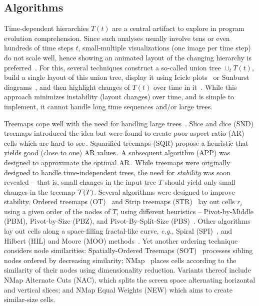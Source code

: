 \subsection{Algorithms}
\label{sec:algorithms}
%
Time-dependent hierarchies $T(t)$ are a central artifact to explore in program evolution comprehension. Since such analyses usually involve tens or even hundreds of time steps $t$, small-multiple visualizations (one image per time step) do not scale well, hence showing an animated layout of the changing hierarchy is preferred~\citep{diehl08}. For this, several techniques construct a so-called union tree $\cup_tT(t)$, build a single layout of this union tree, display it using Icicle plots~\citep{Kruskal1983} or Sunburst diagrams~\citep{sunburst}, and then highlight changes of $T(t)$ over time in it~\citep{ersoy_sequence}. While this approach minimizes instability (layout changes) over time, and is simple to implement, it cannot handle long time sequences and/or large trees.

Treemaps cope well with the need for handling large trees~\citep{schulz11_treesurvey,hci_treemaps,treevis,landesberger11}.  Slice and dice (SND) treemaps introduced the idea but were found to create poor aspect-ratio (AR) cells which are hard to see\,\citep{shneiderman92}. Squarified treemaps (SQR) propose a heuristic that yields good (close to one) AR values\,\citep{sqr}. A subsequent algorithm (APP) was designed to approximate the optimal AR\,\citep{nagamochi07}. While treemaps were originally designed to handle time-independent trees, the need for \emph{stability} was soon revealed -- that is, small changes in the input tree $T$ should yield only small changes in the treemap ${\cal T}(T)$.
Several algorithms were designed to improve stability. Ordered treemaps (OT)~\citep{ordered} and Strip treemaps (STR)~\citep{bederson02} lay out cells $r_i$ using a given order of the nodes of $T$, using different heuristics -- Pivot-by-Middle (PBM), Pivot-by-Size (PBZ), and Pivot-By-Split-Size (PBS)~\citep{ordered}. Other algorithms lay out cells along a space-filling fractal-like curve, \emph{e.g.}, Spiral (SPI)~\citep{spiral}, and Hilbert (HIL) and Moore (MOO) methods~\citep{hilbert_moore}. Yet another ordering technique considers node similarities: Spatially-Ordered Treemaps (SOT)~\citep{sot} processes sibling nodes ordered by decreasing similarity; NMap~\citep{nmap} places cells according to the similarity of their nodes using dimensionality reduction. Variants thereof include NMap Alternate Cuts (NAC), which splits the screen space alternating horizontal and vertical slices; and NMap Equal Weights (NEW) which aims to create similar-size cells.

